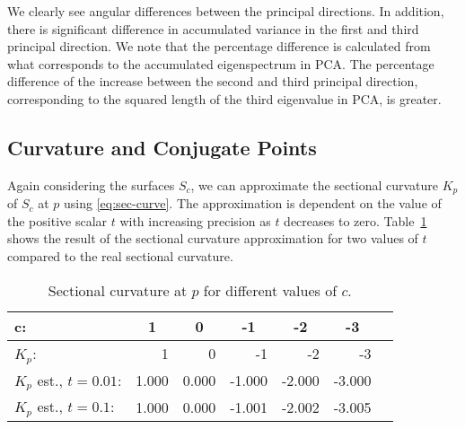\documentclass[final]{svjour3}
\begin{document}
We clearly see angular differences between the principal directions. In
addition, there is significant difference in accumulated variance in the 
first and third principal
direction. We note that the percentage difference is calculated from 
what corresponds to the accumulated eigenspectrum in PCA. The percentage difference of the increase between the
second and third principal direction, corresponding to the squared length of the third eigenvalue in
PCA, is greater.

\subsection{Curvature and Conjugate Points}
Again considering the surfaces $S_c$,
we can approximate the sectional curvature $K_p$ of
$S_c$ at $p$ using \eqref{eq:sec-curve}.
The approximation is dependent on the value of the positive scalar $t$ with 
increasing precision as $t$ decreases to zero.
Table~\ref{table:Ks} shows the result of the sectional curvature approximation for 
two values of $t$ compared to the real sectional curvature.
\begin{table}[ht]
    \scriptsize
    \setlength{\tabcolsep}{5pt}
\begin{center}
\begin{tabular}{lrrrrrr}
  \hline
  \bf{c}: & 
\multicolumn{1}{c}{\bf{1}} &
  \multicolumn{1}{c}{\bf{0}} &
  \multicolumn{1}{c}{\bf{-1}} & 
  \multicolumn{1}{c}{\bf{-2}} &
  \multicolumn{1}{c}{\bf{-3}}\\
  \hline
  $K_p$:        
& 1   & 0  & -1  & -2  & -3  \\
  $K_p$ est., $t=0.01$:  
& 1.000   & 0.000  & -1.000  & -2.000  & -3.000  \\
  $K_p$ est., $t=0.1$:  
& 1.000   & 0.000  & -1.001  & -2.002  & -3.005  \\
   \hline
\end{tabular}
\caption{Sectional curvature at $p$ for different values of $c$.}
\label{table:Ks}
\end{center}
\end{table}
\end{document}
